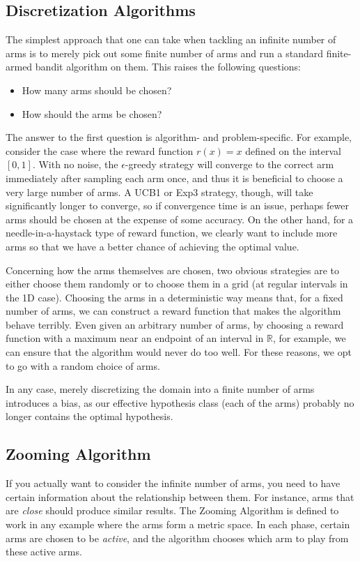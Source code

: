 \documentclass{article}
\begin{document}
\subsection{Discretization Algorithms}
The simplest approach that one can take when tackling an infinite number of
arms is to merely pick out some finite number of arms and run a standard
finite-armed bandit algorithm on them.  This raises the following 
questions:
\begin{itemize}
\item How many arms should be chosen?
\item How should the arms be chosen?
\end{itemize}
The answer to the first question is algorithm- and problem-specific.  For
example, consider the case where the reward function $r(x) = x$ defined
on the interval $[0,1]$.  With no noise, the $\epsilon$-greedy strategy
will converge to the correct arm immediately after sampling each arm once,
and thus it is beneficial to choose a very large number of arms.  A
UCB1 or Exp3 strategy, though, will take significantly longer to
converge, so if convergence time is an issue, perhaps fewer arms should be
chosen at the expense of some accuracy.  On the other hand, for a
needle-in-a-haystack type of reward function, we clearly want to
include more arms so that we have a better chance of achieving the
optimal value.

Concerning how the arms themselves are chosen, two obvious strategies are
to either choose them randomly or to choose them in a grid (at regular
intervals in the 1D case).  Choosing the arms in a deterministic way
means that, for a fixed number of arms, we can construct a reward function
that makes the algorithm behave terribly.  Even given an arbitrary number
of arms, by choosing a reward function with a maximum near an endpoint of
an interval in $\mathbb{R}$, for example, we can ensure that the algorithm
would never do too well.  For these reasons, we opt to go with a random
choice of arms.

In any case, merely discretizing the domain into a finite number of arms
introduces a bias, as our effective hypothesis class (each of the arms)
probably no longer contains the optimal hypothesis.

\subsection{Zooming Algorithm}
If you actually want to consider the infinite number of arms, you need
to have certain information about the relationship between them. For
instance, arms that are \emph{close} should produce similar
results. The Zooming Algorithm is defined to work in any example where
the arms form a metric space. In each phase, certain arms are chosen
to be \emph{active}, and the algorithm chooses which arm to play from
these active arms.
\end{document}
